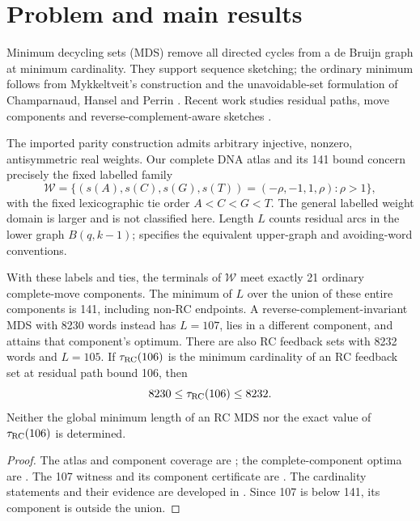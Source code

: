 \section{Problem and main results}
\label{sec:introduction}
Minimum decycling sets (MDS) remove all directed cycles from a de Bruijn graph at minimum cardinality. They support sequence sketching; the ordinary minimum follows from Mykkeltveit's construction and the unavoidable-set formulation of Champarnaud, Hansel and Perrin \cite{Mykkeltveit1972,ChamparnaudHanselPerrin2004}. Recent work studies residual paths, move components and reverse-complement-aware sketches \cite{ZhengKingsfordMarcais2021,PellowEtAl2023,MarcaisDeBlasioKingsford2024,MarcaisElderKingsford2024}.

The imported parity construction \cite{Babanskyy2026Parity} admits arbitrary injective, nonzero, antisymmetric real weights. Our complete DNA atlas and its 141 bound concern precisely the fixed labelled family
\[
 \mathcal W=\{(s(A),s(C),s(G),s(T))=(-\rho,-1,1,\rho):\rho>1\},
\]
with the fixed lexicographic tie order $A<C<G<T$. The general labelled weight domain is larger and is not classified here. Length $L$ counts residual arcs in the lower graph $B(q,k-1)$;  specifies the equivalent upper-graph and avoiding-word conventions.

\begin{theorem}
\label{thm:headline-separation}
With these labels and ties, the terminals of $\mathcal W$ meet exactly 21 ordinary complete-move components. The minimum of $L$ over the union of these entire components is 141, including non-RC endpoints. A reverse-complement-invariant MDS with 8230 words instead has $L=107$, lies in a different component, and attains that component's optimum. There are also RC feedback sets with 8232 words and $L=105$. If $\tau_{\operatorname{RC}}(106)$ is the minimum cardinality of an RC feedback set at residual path bound 106, then
\[
 8230\le\tau_{\operatorname{RC}}(106)\le8232.
\]
Neither the global minimum length of an RC MDS nor the exact value of $\tau_{\operatorname{RC}}(106)$ is determined.
\end{theorem}
\begin{proof}
The atlas and component coverage are ; the complete-component optima are . The 107 witness and its component certificate are . The cardinality statements and their evidence are developed in . Since 107 is below 141, its component is outside the union.
\end{proof}

